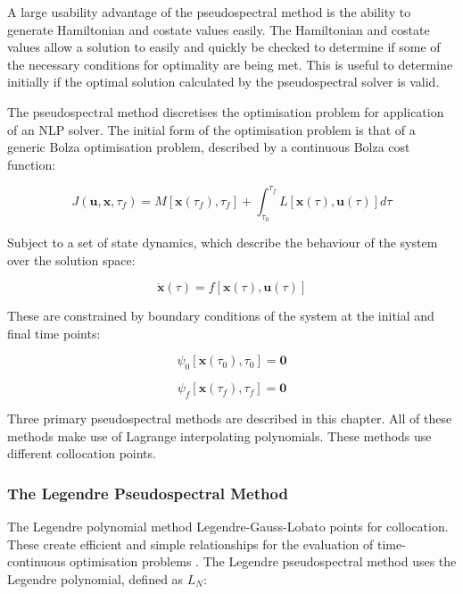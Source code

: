 A large usability advantage of the pseudospectral method is the ability to generate Hamiltonian and costate values easily\cite{Gong2010,Fahroo2001}. The Hamiltonian and costate values allow a solution to easily and quickly be checked to determine if some of the necessary conditions for optimality are being met. This is useful to determine initially if the optimal solution calculated by the pseudospectral solver is valid.


The pseudospectral method discretises the optimisation problem for application of an NLP solver. The initial form of the optimisation problem is that of a generic Bolza optimisation problem, described by a continuous Bolza cost function:

\begin{equation} \label{eq:cost}
J(\textbf{u},\textbf{x},\tau_f) = M[\textbf{x}(\tau_f),\tau_f] +   \int_{\tau_0}^{\tau_f} L[\textbf{x}(\tau),\textbf{u}(\tau)] d\tau
\end{equation}

Subject to a set of state dynamics, which describe the behaviour of the system over the solution space: 

\begin{equation} \label{eq:state}
\dot{\textbf{x}}(\tau) = f[\textbf{x}(\tau),\textbf{u}(\tau)]
\end{equation}

These are constrained by boundary conditions of the system at the initial and final time points:

\begin{equation}
\psi_0[\textbf{x}(\tau_0), \tau_0] = \textbf{0}
\end{equation}

\begin{equation} \label{eq:2}
\psi_f[\textbf{x}(\tau_f), \tau_f] = \textbf{0}
\end{equation}

Three primary pseudospectral methods are described in this chapter. All of these methods make use of Lagrange interpolating polynomials. These methods use different collocation points.


\subsubsection{The Legendre Pseudospectral Method}

The Legendre polynomial method\cite{Fahroo1999} Legendre-Gauss-Lobato points for collocation. These create efficient and simple relationships for the evaluation of time-continuous optimisation problems \cite{Fahroo2000}. 
The Legendre  pseudospectral method uses the Legendre polynomial, defined as $L_N$:

